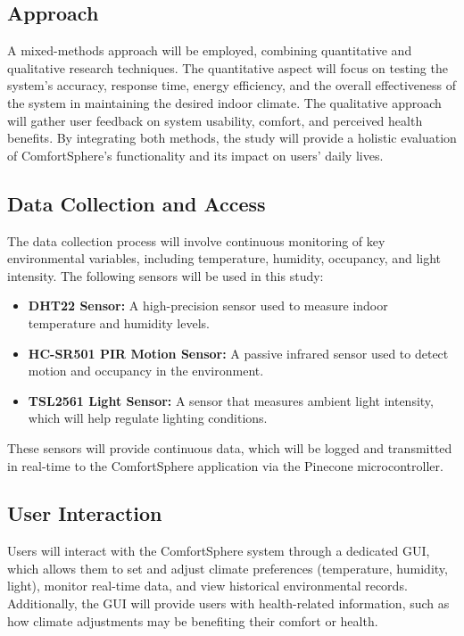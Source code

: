 \documentclass[a4paper]{scrartcl}
\begin{document}
	\subsection{Approach}
	A mixed-methods approach will be employed, combining quantitative and qualitative research techniques. The quantitative aspect will focus on testing the system's accuracy, response time, energy efficiency, and the overall effectiveness of the system in maintaining the desired indoor climate. The qualitative approach will gather user feedback on system usability, comfort, and perceived health benefits. By integrating both methods, the study will provide a holistic evaluation of ComfortSphere's functionality and its impact on users' daily lives.

	\subsection{Data Collection and Access}
	The data collection process will involve continuous monitoring of key environmental variables, including temperature, humidity, occupancy, and light intensity. The following sensors will be used in this study:

	\begin{itemize}
		\item \textbf{DHT22 Sensor:} A high-precision sensor used to measure indoor temperature and humidity levels.
		\item \textbf{HC-SR501 PIR Motion Sensor:} A passive infrared sensor used to detect motion and occupancy in the environment.
		\item \textbf{TSL2561 Light Sensor:} A sensor that measures ambient light intensity, which will help regulate lighting conditions.
	\end{itemize}

	These sensors will provide continuous data, which will be logged and transmitted in real-time to the ComfortSphere application via the Pinecone microcontroller.

	\subsection{User Interaction}
	Users will interact with the ComfortSphere system through a dedicated GUI, which allows them to set and adjust climate preferences (temperature, humidity, light), monitor real-time data, and view historical environmental records. Additionally, the GUI will provide users with health-related information, such as how climate adjustments may be benefiting their comfort or health.
\end{document}

